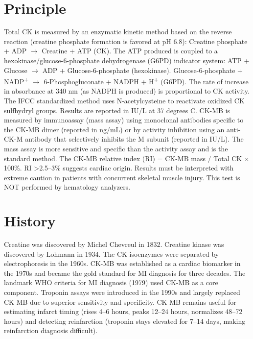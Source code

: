 \section*{Principle}
Total CK is measured by an enzymatic kinetic method based on the reverse reaction (creatine phosphate formation is favored at pH 6.8): Creatine phosphate + ADP $\rightarrow$ Creatine + ATP (CK). The ATP produced is coupled to a hexokinase/glucose-6-phosphate dehydrogenase (G6PD) indicator system: ATP + Glucose $\rightarrow$ ADP + Glucose-6-phosphate (hexokinase). Glucose-6-phosphate + NADP\textsuperscript{+} $\rightarrow$ 6-Phosphogluconate + NADPH + H\textsuperscript{+} (G6PD). The rate of increase in absorbance at 340 nm (as NADPH is produced) is proportional to CK activity. The IFCC standardized method uses N-acetylcysteine to reactivate oxidized CK sulfhydryl groups. Results are reported in IU/L at 37 degrees C. CK-MB is measured by immunoassay (mass assay) using monoclonal antibodies specific to the CK-MB dimer (reported in ng/mL) or by activity inhibition using an anti-CK-M antibody that selectively inhibits the M subunit (reported in IU/L). The mass assay is more sensitive and specific than the activity assay and is the standard method. The CK-MB relative index (RI) = CK-MB mass / Total CK $\times$ 100\%. RI >2.5--3\% suggests cardiac origin. Results must be interpreted with extreme caution in patients with concurrent skeletal muscle injury. This test is NOT performed by hematology analyzers.

\section*{History}
Creatine was discovered by Michel Chevreul in 1832. Creatine kinase was discovered by Lohmann in 1934. The CK isoenzymes were separated by electrophoresis in the 1960s. CK-MB was established as a cardiac biomarker in the 1970s and became the gold standard for MI diagnosis for three decades. The landmark WHO criteria for MI diagnosis (1979) used CK-MB as a core component. Troponin assays were introduced in the 1990s and largely replaced CK-MB due to superior sensitivity and specificity. CK-MB remains useful for estimating infarct timing (rises 4--6 hours, peaks 12--24 hours, normalizes 48--72 hours) and detecting reinfarction (troponin stays elevated for 7--14 days, making reinfarction diagnosis difficult).


